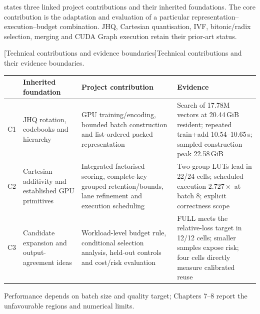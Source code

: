  states three linked project contributions and
their inherited foundations. The core contribution is the adaptation and
evaluation of a particular representation--execution--budget combination.
JHQ, Cartesian quantisation, IVF, bitonic/radix selection, merging and CUDA
Graph execution retain their prior-art status.

\par\medskip\noindent\begin{minipage}{\linewidth}
\centering\captionsetup{hypcap=false}
[Technical contributions and evidence boundaries]{Technical contributions and their evidence boundaries.}
\label{tab:1-contributions}
\footnotesize\setlength{\tabcolsep}{4pt}
\begin{tabularx}{\linewidth}{@{}l*{3}{>{\raggedright\arraybackslash}X}@{}}
\toprule
 & Inherited foundation & Project contribution & Evidence \\
\midrule
C1 & JHQ rotation, codebooks and hierarchy & GPU training/encoding,
bounded batch construction and list-ordered packed representation
& Search of 17.78M vectors at 20.44\,GiB resident; repeated train+add
10.54--10.65\,s; sampled construction peak 22.58\,GiB \\
C2 & Cartesian additivity and established GPU primitives & Integrated
factorised scoring, complete-key grouped retention/bounds, lane refinement
and execution scheduling & Two-group LUTs lead in 22/24 cells;
scheduled execution $2.727\times$ at batch 8; explicit correctness scope \\
C3 & Candidate expansion and output-agreement ideas & Workload-level
budget rule, conditional selection analysis, held-out controls and cost/risk
evaluation & FULL meets the relative-loss target in 12/12 cells;
smaller samples expose risk; four cells directly measure calibrated reuse \\
\bottomrule
\end{tabularx}
\end{minipage}\par\medskip

Performance depends on batch size and quality target; Chapters 7--8 report the unfavourable regions and numerical limits.

